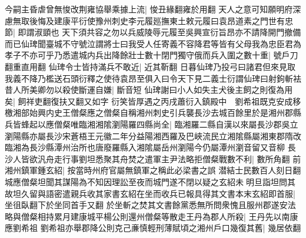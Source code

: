 今嗣主昏虐曾無悛改荆雍協舉乘據上流|{
	悛丑緣翻雍於用翻}
天人之意可知願明府深慮無取後悔及建康平衍使豫州刺史李元履廵撫東土敕元履曰袁昂道素之門世有忠節|{
	即謂淑顗也}
天下須共容之勿以兵威陵辱元履至吳興宣衍旨昂亦不請降開門撤備而已仙琕聞臺城不守號泣謂將士曰我受人任寄義不容降君等皆有父母我為忠臣君為孝子不亦可乎乃悉遣城内兵出降餘壯士數十閉門獨守俄而兵入圍之數十重|{
	號戶刀翻重直用翻}
仙琕令士皆持滿兵不敢近|{
	近其靳翻}
日暮仙琕乃投弓曰諸君但來見取我義不降乃檻送石頭衍釋之使待袁昂至俱入曰令天下見二義士衍謂仙琕曰射鉤斬袪昔人所美卿勿以殺使斷運自嫌|{
	斷音短}
仙琕謝曰小人如失主犬後主飼之則復為用矣|{
	飼祥吏翻復扶又翻又如字}
衍笑皆厚遇之丙戌蕭衍入鎮殿中　劉希祖既克安成移檄湘部始興内史王僧粲應之僧粲自稱湘州刺史引兵襲長沙去城百餘里於是湘州郡縣兵皆蜂起以應僧粲唯臨湘湘隂瀏陽羅四縣尚全|{
	臨湘羅二縣自漢以來屬長沙郡吳立瀏陽縣亦屬長沙宋蒼梧王元徽二年分益陽湘西羅及巴峽流民立湘隂縣屬湘東郡隋改臨湘為長沙縣潭州治所也唐廢羅縣入湘隂屬岳州瀏陽今仍屬潭州瀏音留又音柳}
長沙人皆欲汎舟走行事劉坦悉聚其舟焚之遣軍主尹法略拒僧粲戰數不利|{
	數所角翻}
前湘州鎮軍鍾玄紹|{
	按當時州府官屬無鎮軍之稱此必梁書之誤}
潜結士民數百人刻日翻城應僧粲坦聞其謀陽為不知因理訟至夜而城門遂不閉以疑之玄紹未明旦詣坦問其故坦久留與語密遣親兵收其家書玄紹在坐而收兵已報具得其文書本末玄紹即首服|{
	坐徂臥翻下於坐同首手又翻}
於坐斬之焚其文書餘黨悉無所問衆愧且服州郡遂安法略與僧粲相持累月建康城平楊公則還州僧粲等散走王丹為郡人所殺|{
	王丹先以南康應劉希祖}
劉希祖亦舉郡降公則克己亷慎輕刑薄賦頃之湘州戶口幾復其舊|{
	幾居依翻}


